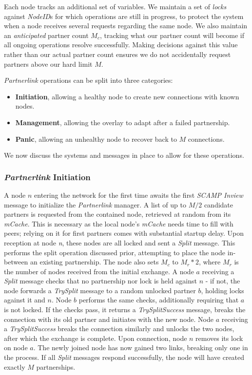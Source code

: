 \documentclass[12pt,a4paper]{article}
\begin{document}
Each node tracks an additional set of variables. We maintain a set of \textit{locks} against \textit{NodeID}s for which operations are still in progress, to protect the system when a node receives several requests regarding the same node. We also maintain an \textit{anticipated} partner count \(M_c\), tracking what our partner count will become if all ongoing operations resolve successfully. Making decisions against this value rather than our actual partner count ensures we do not accidentally request partners above our hard limit \(M\).

\textit{Partnerlink} operations can be split into three categories:
\begin{itemize}
	\item \textbf{Initiation}, allowing a healthy node to create new connections with known nodes.
	\item \textbf{Management}, allowing the overlay to adapt after a failed partnership.
	\item \textbf{Panic}, allowing an unhealthy node to recover back to \(M\) connections.
\end{itemize}
We now discuss the systems and messages in place to allow for these operations.

\subsubsection{\textit{Partnerlink} Initiation} \label{css:partnerlink:initiation}
A node \(n\) entering the network for the first time awaits the first \textit{SCAMP Inview} message to initialize the \textit{Partnerlink} manager. A list of up to \(M / 2\) candidate partners is requested from the contained node, retrieved at random from its \textit{mCache}. This is necessary as the local node's \textit{mCache} needs time to fill with peers; relying on it for first partners comes with substantial startup delay.
Upon reception at node \textit{n}, these nodes are all locked and sent a \textit{Split} message. This performs the split operation discussed prior, attempting to place the node in-between an existing partnership. The node also sets \(M_c\) to \(M_r * 2\), where \(M_r\) is the number of nodes received from the initial exchange. A node \(a\) receiving a \textit{Split} message checks that no partnership nor lock is held against \(n\) - if not, the node forwards a \textit{TrySplit} message to a random unlocked partner \(b\), holding locks against it and \(n\). Node \(b\) performs the same checks, additionally requiring that \(a\) is not locked. If the checks pass, it returns a \textit{TrySplitSuccess} message, breaks the connection with its old partner and initiates with the new node. Node \(a\) receiving a \textit{TrySplitSuccess} breaks the connection similarly and unlocks the two nodes, after which the exchange is complete. Upon connection, node \(n\) removes its lock on node \(a\). The newly joined node has now gained two links, breaking only one in the process. If all \textit{Split} messages respond successfully, the node will have created exactly \(M\) partnerships.
\end{document}
